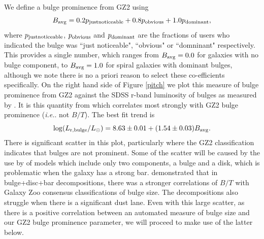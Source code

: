 \documentclass[usenatbib]{mn2e}
\newcommand{\ie}{{\it i.e.}}
\newcommand{\be}{\begin{equation}}
\newcommand{\ee}{\end{equation}}
\begin{document}
We define a bulge prominence from GZ2 using
\be
\label{eqn:bulge}
B_{\rm avg} = 0.2p_{\rm  just noticeable} + 0.8p_{\rm obvious}+ 1.0p_{\rm dominant},
\ee
where $p_{\rm  just noticeable}$, $p_{\rm obvious}$ and $p_{\rm dominant}$ are the fractions of users who indicated the bulge was ``just noticeable", ``obvious" or ``domninant" respectively. This provides a single number, which ranges from $B_{\rm avg} = 0.0$ for galaxies with no bulge component, to $B_{\rm avg} = 1.0$ for spiral galaxies with dominant bulges, although we note there is no a priori reason to select these co-efficients specifically. On the right hand side of Figure \ref{pitch} we plot this measure of bulge prominence from GZ2 against the SDSS r-band luminosity of bulges as measured by \citet{Simard2011}. It is this quantity from \citet{Simard2011} which correlates most strongly with GZ2 bulge prominence (\ie. not $B/T$).  The best fit trend is 
\be 
\log(L_{\rm r,bulge}/L_\odot) = 8.63\pm0.01 + (1.54\pm0.03) B_{\rm avg}.
\ee
There is significant scatter in this plot, particularly where the GZ2 classification indicates that bulges are not prominent. Some of the scatter will be caused by the use by \citet{Simard2011} of models which include only two components, a bulge and a disk, which is problematic when the galaxy has a strong bar. \citet{Kruk2018} demonstrated that in bulge+disc+bar decompositions, there was a stronger correlations of $B/T$ with Galaxy Zoo consensus classifications of bulge size. The \citet{Simard2011} decompositions also struggle when there is a significant dust lane. Even with this large scatter, as there is a positive correlation between an automated measure of bulge size and our GZ2 bulge prominence parameter, we will proceed to make use of the latter below. 
 
\end{document}
